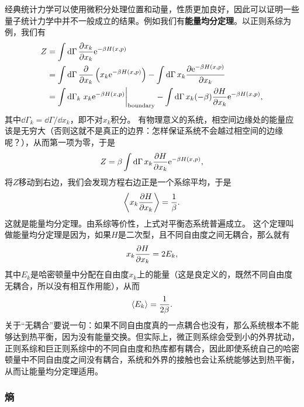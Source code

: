 \documentclass[hyperref, UTF8, a4paper]{ctexart}
\newcommand*{\ee}{\mathrm{e}}
\begin{document}
经典统计力学可以使用微积分处理位置和动量，性质更加良好，因此可以证明一些量子统计力学中并不一般成立的结果。例如我们有\textbf{能量均分定理}。以正则系综为例，我们有
\[
    \begin{aligned}
        Z &= \int \dd{\Gamma} \pdv{x_k}{x_k} \ee^{- \beta H(x, p)} \\
        &= \int \dd{\Gamma} \pdv{x_k} \left(x_k \ee^{- \beta H(x, p)}\right) - \int \dd{\Gamma} x_k \pdv{\ee^{- \beta H(x, p)}}{x_k} \\
        &= \int \dd{\Gamma_k} \eval{x_k \ee^{- \beta H(x, p)}}_\text{boundary} - \int \dd{\Gamma} x_k ( - \beta) \pdv{H}{x_k} \ee^{- \beta H(x, p)},
    \end{aligned}
\]
其中$\dd{\Gamma_k}=\dd{\Gamma}/\dd{x_k}$，即不对$x_k$积分。
有物理意义的系统，相空间边缘处的能量应该是无穷大（否则这就不是真正的边界：怎样保证系统不会越过相空间的边缘呢？），从而第一项为零，于是
\[
    Z = \beta \int \dd{\Gamma} x_k \pdv{H}{x_k} \ee^{-\beta H(x, p)},
\] 
将$Z$移动到右边，我们会发现方程右边正是一个系综平均，于是
\begin{equation}
    \expval{x_k \pdv{H}{x_k}} = \frac{1}{\beta}.
\end{equation}
这就是能量均分定理。由系综等价性，上式对平衡态系统普遍成立。
这个定理叫做能量均分定理是因为，如果$H$是二次型，且不同自由度之间无耦合，那么就有
\[
    x_k \pdv{H}{x_k} = 2 E_k,
\]
其中$E_k$是哈密顿量中分配在自由度$x_k$上的能量（这是良定义的，既然不同自由度无耦合，所以没有相互作用能），从而
\begin{equation}
    \expval{E_k} = \frac{1}{2\beta}.
\end{equation}
关于“无耦合”要说一句：如果不同自由度真的一点耦合也没有，那么系统根本不能够达到热平衡，因为没有能量交换。但实际上，微正则系综会受到小的外界扰动，正则系综和巨正则系综中的不同自由度和热库都有耦合，因此即使系统自己的哈密顿量中不同自由度之间没有耦合，系统和外界的接触也会让系统能够达到热平衡，从而让能量均分定理适用。

\subsubsection{熵}
\end{document}
